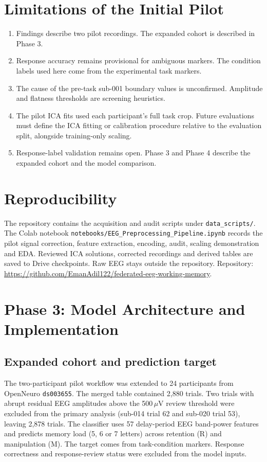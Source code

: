 \documentclass[11pt,a4paper]{article}
\begin{document}
\section{Limitations of the Initial Pilot}
\begin{enumerate}[leftmargin=*]
  \item Findings describe two pilot recordings. The expanded cohort is described in Phase 3.
  \item Response accuracy remains provisional for ambiguous markers. The
  condition labels used here come from the experimental task markers.
  \item The cause of the pre-task sub-001 boundary values is unconfirmed.
  Amplitude and flatness thresholds are screening heuristics.
  \item The pilot ICA fits used each participant's full task crop. Future
  evaluations must define the ICA fitting or calibration procedure relative
  to the evaluation split, alongside training-only scaling.
  \item Response-label validation remains open. Phase 3 and Phase 4 describe
  the expanded cohort and the model comparison.
\end{enumerate}

\section{Reproducibility}
The repository contains the acquisition and audit scripts under
\texttt{data\_scripts/}. The Colab notebook
\texttt{notebooks/EEG\_Preprocessing\_Pipeline.ipynb} records the pilot signal
correction, feature extraction, encoding, audit, scaling demonstration and
EDA. Reviewed ICA solutions, corrected recordings and derived tables are
saved to Drive checkpoints. Raw EEG stays outside the repository.
Repository: \url{https://github.com/EmanAdil122/federated-eeg-working-memory}.

\section{Phase 3: Model Architecture and Implementation}

\subsection{Expanded cohort and prediction target}
The two-participant pilot workflow was extended to 24 participants from
OpenNeuro \texttt{ds003655}. The merged table contained 2,880 trials.
Two trials with abrupt residual EEG amplitudes above the 500\,$\mu$V
review threshold were excluded from the primary analysis
(sub-014 trial 62 and sub-020 trial 53), leaving 2,878 trials.
The classifier uses 57 delay-period EEG band-power features and predicts
memory load (5, 6 or 7 letters) across retention (R) and manipulation (M).
The target comes from task-condition markers. Response correctness and
response-review status were excluded from the model inputs.
\end{document}
